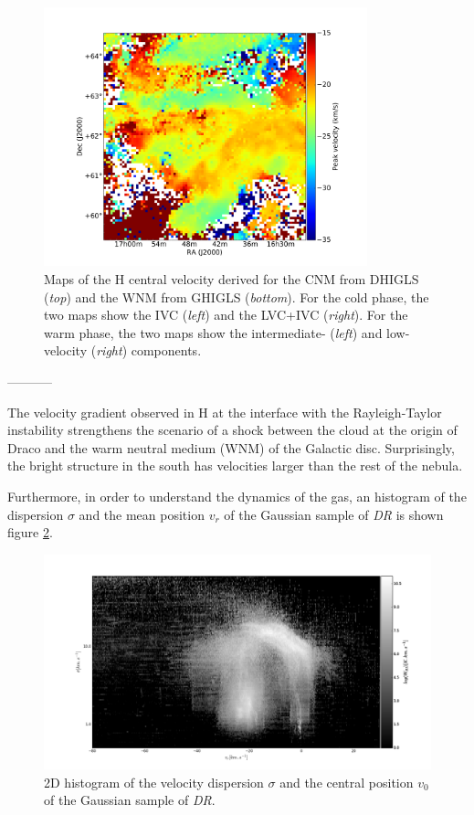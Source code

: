 \documentclass[traditabstract]{aa}
\begin{document}
\begin{figure}[h]
  \includegraphics[page=5,height=7.5cm,trim=110 30 130 75,clip=true]{Figures/GHIGLS_velo.pdf}
  \caption{\label{velo_HI} Maps of the H central velocity derived for the CNM from DHIGLS (\emph{top}) and the WNM from GHIGLS (\emph{bottom}). For the cold phase, the two maps show the IVC (\emph{left}) and the LVC+IVC (\emph{right}). For the warm phase, the two maps show the intermediate- (\emph{left}) and low-velocity (\emph{right}) components.}
\end{figure}

-----------

    The velocity gradient observed in H at the interface  with the Rayleigh-Taylor instability strengthens the scenario of a shock between the cloud at the origin of Draco and the warm neutral 
 medium (WNM) of the Galactic disc. Surprisingly, the bright structure in the south has velocities larger than the rest of the nebula.

Furthermore, in order to understand the dynamics of the gas, an histogram of the 
dispersion $\sigma$ and the mean position $v_{r}$ of the Gaussian sample of \textit{DR} is shown figure \ref{heatmap}.

\begin{figure}
  \centering
  \includegraphics[width=0.7\linewidth,trim=105 30 75 70,clip=true]{Figures/heatmap_png.png}
  \caption{\label{heatmap} 2D histogram of the velocity dispersion $\sigma$ and the central position $v_0$ of the Gaussian sample of \textit{DR}.}
\end{figure}
\end{document}
